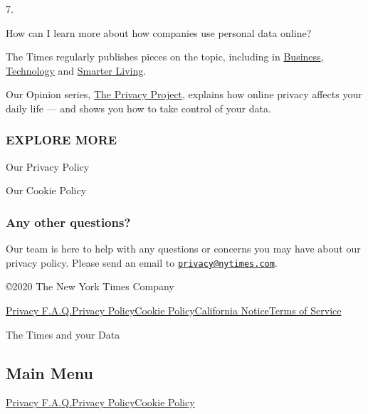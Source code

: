 7.

How can I learn more about how companies use personal data online?

The Times regularly publishes pieces on the topic, including in
\href{https://www.nytimes.com/2019/11/04/business/secret-consumer-score-access.html}{Business},
\href{https://www.nytimes.com/2019/11/19/technology/artificial-intelligence-dawn-song.html}{Technology}
and
\href{https://www.nytimes.com/2019/11/24/smarter-living/privacy-online-how-to-stop-advertiser-tracking-opt-out.html}{Smarter
Living}.

Our Opinion series,
\href{https://www.nytimes.com/series/new-york-times-privacy-project}{The
Privacy Project}, explains how online privacy affects your daily life
--- and shows you how to take control of your data.

\hypertarget{explore-more}{%
\subsubsection{EXPLORE MORE}\label{explore-more}}

\href{/privacy/privacy-policy}{}

Our Privacy Policy

\href{/privacy/cookie-policy}{}

Our Cookie Policy

\hypertarget{any-other-questions}{%
\subsubsection{Any other questions?}\label{any-other-questions}}

Our team is here to help with any questions or concerns you may have
about our privacy policy. Please send an email to
\href{mailto:privacy@nytimes.com}{\nolinkurl{privacy@nytimes.com}}.

©2020 The New York Times Company

\href{/privacy}{Privacy F.A.Q.}\href{/privacy/privacy-policy}{Privacy
Policy}\href{/privacy/cookie-policy}{Cookie
Policy}\href{/privacy/california-notice}{California
Notice}\href{https://help.nytimes.com/hc/en-us/articles/115014893428-Terms-of-service}{Terms
of Service}

The Times and your Data

\hypertarget{main-menu}{%
\subsection{Main Menu}\label{main-menu}}

\href{/privacy}{Privacy F.A.Q.}\href{/privacy/privacy-policy}{Privacy
Policy}\href{/privacy/cookie-policy}{Cookie Policy}
